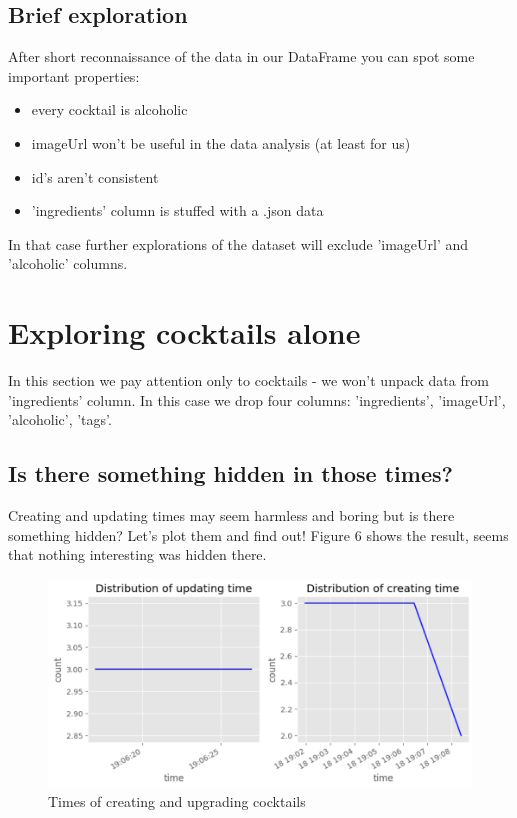 \documentclass[a4paper]{article}
\begin{document}
\subsection{Brief exploration}
After short reconnaissance of the data in our DataFrame you can spot some important properties:
\begin{itemize}
    \item every cocktail is alcoholic
    \item imageUrl won't be useful in the data analysis (at least for us)
    \item id's aren't consistent
    \item 'ingredients' column is stuffed with a .json data
\end{itemize}
In that case further explorations of the dataset will exclude 'imageUrl' and 'alcoholic' columns.

\section{Exploring cocktails alone}
In this section we pay attention only to cocktails - we won't unpack data from 'ingredients' column. In this case we drop four columns: 'ingredients', 'imageUrl', 'alcoholic', 'tags'.
\subsection{Is there something hidden in those times?}
Creating and updating times may seem harmless and boring but is there something hidden? Let's plot them and find out! Figure 6 shows the result, seems that nothing interesting was hidden there. 

\begin{figure}[H]
    \centering
    \includegraphics[width=0.8\linewidth]{times cocktails.png}
    \caption{Times of creating and upgrading cocktails}
    \label{fig:enter-label}
\end{figure}
\end{document}
